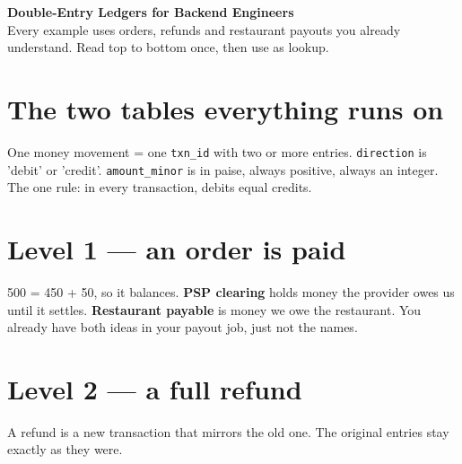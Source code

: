 \documentclass[10pt,a4paper]{article}
\begin{document}
\begin{center}{\LARGE\bfseries Double-Entry Ledgers for Backend Engineers}\\[2pt]
Every example uses orders, refunds and restaurant payouts you already understand. Read top to bottom once, then use as lookup.\end{center}

\section{The two tables everything runs on}
One money movement = one \texttt{txn\_id} with two or more entries. \texttt{direction} is 'debit' or 'credit'. \texttt{amount\_minor} is in paise, always positive, always an integer. The one rule: in every transaction, debits equal credits.

\section{Level 1 — an order is paid}
500 = 450 + 50, so it balances. \textbf{PSP clearing} holds money the provider owes us until it settles. \textbf{Restaurant payable} is money we owe the restaurant. You already have both ideas in your payout job, just not the names.

\section{Level 2 — a full refund}
A refund is a new transaction that mirrors the old one. The original entries stay exactly as they were.
\end{document}
